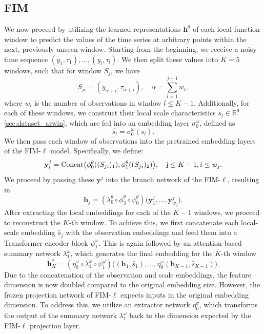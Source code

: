 \documentclass{article}
\theoremstyle{plain}
\theoremstyle{definition}
\theoremstyle{remark}
\begin{document}
\subsection{FIM}\label{sec:FIM}
We now proceed by utilizing the learned representations \(\mathbf{h}^{\theta}\) of each local function window to predict the values of the time series at arbitrary points within the next, previously unseen window.
Starting from the beginning, we receive a noisy time sequence \((y_1, \tau_1), \ldots, (y_l, \tau_l)\). 
We then split these values into \(K=5\) windows, such that for window \(S_j\), we have
\[
S_{ji} = (y_{\alpha + i}, \tau_{\alpha + i}), \quad \alpha = \sum_{l=1}^{j-1}w_l,
\]
where \(w_l\) is the number of observations in window \(l \leq K-1\).
Additionally, for each of these windows, we construct their local scale characteristics \(s_l \in \mathbb{R}^9\) \ref{sec:dataset_arwin}, which are fed into an embedding layer \(\sigma^{\omega}_0\), defined as
\[
\hat{s_l} = \sigma^{\omega}_0(s_l).
\]
We then pass each window of observations into the pretrained embedding layers of the FIM-\(\ell\) model. Specifically, we define:
\[
    \mathbf{y}^j_i = \text{Concat}\big(\phi^{\theta}_0((S_{ji})_1), \phi^{\theta}_1((S_{ji})_2)\big), \quad \text j \leq K-1, i \leq w_j.
\]
We proceed by passing these \(\mathbf{y}^j\) into the branch network of the FIM-\(\ell\), resulting in
\[
    \mathbf{h}_j = (\lambda^{\theta}_0 \circ \phi^{\theta}_3 \circ \psi^{\theta}_0)\big(\mathbf{y}^{j}_1, \dots, \mathbf{y}^{j}_{w_j}\big).
\]
After extracting the local embeddings for each of the \(K-1\) windows, we proceed to reconstruct the \(K\)-th window. To achieve this, we first concatenate each local-scale embedding \(\hat{s}_j\) with the observation embeddings and feed them into a Transformer encoder block \(\psi^{\omega}_1\). This is again followed by an attention-based summary network \(\lambda^{\omega}_1\), which generates the final embedding for the \(K\)-th window
\[
    \mathbf{h}^{*}_K = (\eta^{\omega}_0 \circ \lambda^{\omega}_1 \circ \psi^{\omega}_1)\Big(( \mathbf{h}_1, \hat{s}_1), \ldots, \eta^{\omega}_0( \mathbf{h}_{K-1}, \hat{s}_{K-1})\Big).
\]
Due to the concatenation of the observation and scale embeddings, the feature dimension is now doubled compared to the original embedding size. However, the frozen projection network of FIM-\(\ell\) expects inputs in the original embedding dimension. To address this, we utilize an extractor network \(\eta^{\sigma}_0\), which transforms the output of the summary network $\lambda^{\omega}_1$ back to the dimension expected by the FIM-\(\ell\) projection layer.
\end{document}

